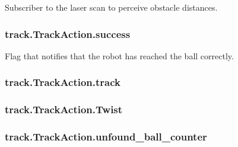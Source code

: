 Subscriber to the laser scan to perceive obstacle distances. 

\subsubsection[{\texorpdfstring{success}{success}}]{\setlength{\rightskip}{0pt plus 5cm}track.\+Track\+Action.\+success\hspace{0.3cm}{\ttfamily [static]}}\hypertarget{classtrack_1_1TrackAction_a8c79189ba62cf316bffaa4c00b0320fe}{}\label{classtrack_1_1TrackAction_a8c79189ba62cf316bffaa4c00b0320fe}


Flag that notifies that the robot has reached the ball correctly. 

\subsubsection[{\texorpdfstring{track}{track}}]{\setlength{\rightskip}{0pt plus 5cm}track.\+Track\+Action.\+track\hspace{0.3cm}{\ttfamily [static]}}\hypertarget{classtrack_1_1TrackAction_a3d89a5a6bf3daf63df4b690e4c9a84a8}{}\label{classtrack_1_1TrackAction_a3d89a5a6bf3daf63df4b690e4c9a84a8}
\subsubsection[{\texorpdfstring{Twist}{Twist}}]{\setlength{\rightskip}{0pt plus 5cm}track.\+Track\+Action.\+Twist\hspace{0.3cm}{\ttfamily [static]}}\hypertarget{classtrack_1_1TrackAction_aabd955eb5b74ee508ba27bf6db4129e2}{}\label{classtrack_1_1TrackAction_aabd955eb5b74ee508ba27bf6db4129e2}
\subsubsection[{\texorpdfstring{unfound\+\_\+ball\+\_\+counter}{unfound_ball_counter}}]{\setlength{\rightskip}{0pt plus 5cm}track.\+Track\+Action.\+unfound\+\_\+ball\+\_\+counter\hspace{0.3cm}{\ttfamily [static]}}\hypertarget{classtrack_1_1TrackAction_aabc16f100d1f260d6712d8d74e055fda}{}\label{classtrack_1_1TrackAction_aabc16f100d1f260d6712d8d74e055fda}



